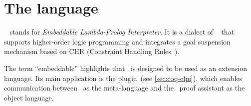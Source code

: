 

% 


% 






\section{The \elpi language}
\label{sec:the-elpi-language}

\elpi~\cite{dunchev15} stands for \emph{Embeddable Lambda-Prolog Interpreter}.
It is a dialect of \lprolog~\cite{miller1991-pf,miller2012} that supports
higher-order logic programming and integrates a goal suspension mechanism
based on CHR (Constraint Handling Rules~\cite{chr,chr-elpi}).

The term ``embeddable'' highlights that \elpi\ is designed to be used as an
extension language. Its main application is the \rocqelpi plugin~(see
\cref{sec:coq-elpi}), which enables communication between \elpi\ as the
meta-language and the \rocq\ proof assistant as the object language.

